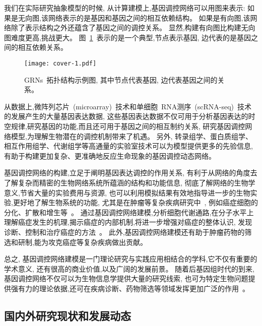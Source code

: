 我们在实际研究抽象模型的时候, 从计算建模上,基因调控网络可以用图来表示:
如果是无向图,该网络表示的是基因和基因之间的相互依赖结构。
如果是有向图,该网络除了表示结构之外还蕴含了基因之间的调控关系。
显然,构建有向图比构建无向图难度更高,挑战更大。
图~\ref{cover-1}~表示的是一个典型,节点表示基因, 边代表的是基因之间的相互依赖关系。
\begin{figure}[!htbp]
    \centering
    \texttt{[image: cover-1.pdf]}
    \caption{GRNs~拓扑结构示例图, 其中节点代表基因, 边代表基因之间的关系。
    }
    \label{cover-1}
\end{figure}

从数据上,微阵列芯片~(microarray)~技术和单细胞~RNA测序~(scRNA-seq)~技术的发展产生的大量基因表达数据,
这些基因表达数据不仅可用于分析基因表达的时空规律,研究基因的功能,而且还可用于基因之间的相互制约关系,
研究基因调控网络模型,为理解生物潜在的调控机制带来了机遇。
另外, 转录组学、蛋白质组学、相互作用组学、代谢组学等高通量的实验室技术可以为模型提供更多的先验信息,
有助于构建更加复杂、更准确地反应生命现象的基因调控动态网络。


基因调控网络的构建,立足于阐明基因表达调控的作用关系,
有利于从网络的角度去了解复杂而精密的生物网络系统所蕴涵的结构和功能信息,
彻底了解网络的生物学意义,节省大量的实验费用与资源,
也可以利用模拟结果有效地指导进一步的生物实验,更好地了解生物系统的功能,
尤其是在肿瘤等复杂疾病研究中~\cite{boyle2017expanded},
例如癌症细胞的分化、扩散和增生等~\cite{hurley2011gene}。
通过基因调控网络建模,分析细胞代谢通路,在分子水平上理解癌症发生的机理,揭示癌症的内部机制,将进一步增强对癌症的整体认识,
发现诊断、控制和治疗癌症的方法~\cite{kreeger2009cancer,yan2016biological}。
此外,基因调控网络建模还有助于肿瘤药物的筛选和研制,能为攻克癌症等复杂疾病做出贡献。

总之, 基因调控网络建模是一门理论研究与实践应用相结合的学科,它不仅有重要的学术意义,
还有很高的商业价值,以及广阔的发展前景。
随着后基因组时代的到来,基因调控网络不仅可以为生物信息学提供大量的研究线索,
也可为特定生物问题提供强有力的理论依据,还可在疾病诊断、药物筛选等领域发挥更加广泛的作用~\cite{kreeger2009cancer}。

\subsection{国内外研究现状和发展动态}

